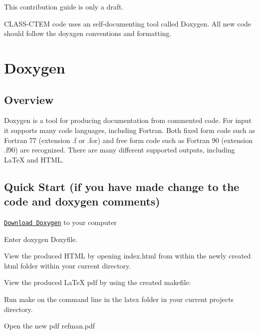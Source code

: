 This contribution guide is only a draft.

C\+L\+A\+S\+S-\/\+C\+T\+E\+M code uses an self-\/documenting tool called Doxygen. All new code should follow the doyxgen conventions and formatting.

\section*{Doxygen}

\subsection*{Overview}

Doxygen is a tool for producing documentation from commented code. For input it supports many code languages, including Fortran. Both fixed form code such as Fortran 77 (extension .f or .for) and free form code such as Fortran 90 (extension .f90) are recognized. There are many different supported outputs, including La\+Te\+X and H\+T\+M\+L.

\subsection*{Quick Start (if you have made change to the code and doxygen comments)}


\begin{DoxyEnumerate}
\item \href{http://www.stack.nl/~dimitri/doxygen/download.html}{\tt Download Doxygen} to your computer
\end{DoxyEnumerate}
\begin{DoxyEnumerate}
\item Enter \textquotesingle{}doxygen Doxyfile\textquotesingle{}.
\end{DoxyEnumerate}
\begin{DoxyEnumerate}
\item View the produced H\+T\+M\+L by opening \textquotesingle{}index.\+html\textquotesingle{} from within the newly created \textquotesingle{}html\textquotesingle{} folder within your current directory.
\end{DoxyEnumerate}
\begin{DoxyEnumerate}
\item View the produced La\+Te\+X pdf by using the created makefile\+:
\begin{DoxyItemize}
\item Run \textquotesingle{}make\textquotesingle{} on the command line in the \textquotesingle{}latex\textquotesingle{} folder in your current project\textquotesingle{}s directory.
\item Open the new pdf \textquotesingle{}refman.\+pdf\textquotesingle{}
\end{DoxyItemize}
\end{DoxyEnumerate}

